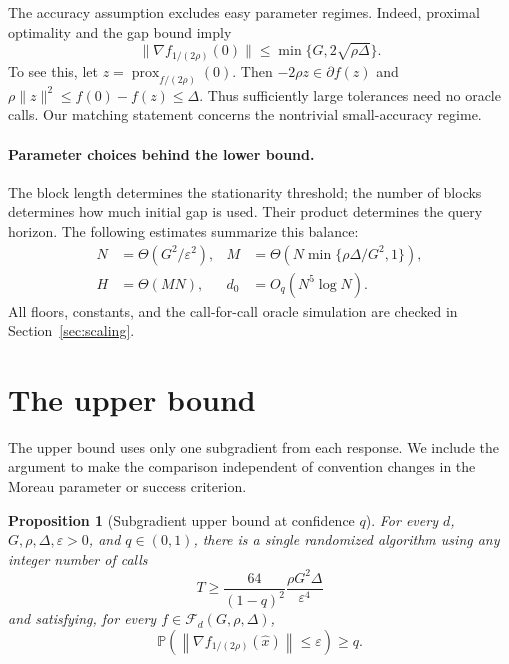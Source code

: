 \documentclass[11pt,a4paper]{article}
\newcommand{\Prob}{\mathbb{P}}
\newcommand{\eps}{\varepsilon}
\newcommand{\norm}[1]{\left\lVert #1\right\rVert}
\newcommand{\cF}{\mathcal F}
\DeclareMathOperator{\prox}{prox}
\newtheorem{proposition}[theorem]{Proposition}
\theoremstyle{definition}
\numberwithin{equation}{section}
\begin{document}
The accuracy assumption excludes easy parameter regimes. Indeed, proximal
optimality and the gap bound imply
\begin{equation}\label{eq:zero-query}
 \|\nabla f_{1/(2\rho)}(0)\|
 \le\min\{G,2\sqrt{\rho\Delta}\}.
\end{equation}
To see this, let $z=\prox_{f/(2\rho)}(0)$. Then $-2\rho z\in\partial f(z)$
and $\rho\|z\|^2\le f(0)-f(z)\le\Delta$.
Thus sufficiently large tolerances need no oracle calls. Our matching
statement concerns the nontrivial small-accuracy regime.

\paragraph{Parameter choices behind the lower bound.}
The block length determines the stationarity threshold; the number of blocks
determines how much initial gap is used. Their product determines the query
horizon. The following estimates summarize this balance:
\[
 \begin{aligned}
 N&=\Theta(G^2/\eps^2),
 &M&=\Theta\!\left(N\min\{\rho\Delta/G^2,1\}\right),\\
 H&=\Theta(MN),
 &d_0&=O_q(N^5\log N).
 \end{aligned}
\]
All floors, constants, and the call-for-call oracle simulation are checked
in Section~\ref{sec:scaling}.

\section{The upper bound}\label{sec:upper}

The upper bound uses only one subgradient from each response. We include
the argument to make the comparison independent of convention changes in
the Moreau parameter or success criterion.

\begin{proposition}[Subgradient upper bound at confidence $q$]\label{prop:upper}
For every $d$, $G,\rho,\Delta,\eps>0$, and $q\in(0,1)$, there is a single randomized algorithm using any integer number of calls
\[
 T\ge \frac{64}{(1-q)^2}\frac{\rho G^2\Delta}{\eps^4}
\]
and satisfying, for every $f\in\cF_d(G,\rho,\Delta)$,
\[
 \Prob\!\left(\norm{\nabla f_{1/(2\rho)}(\widehat x)}\le\eps\right)\ge q.
\]
\end{proposition}
\end{document}
